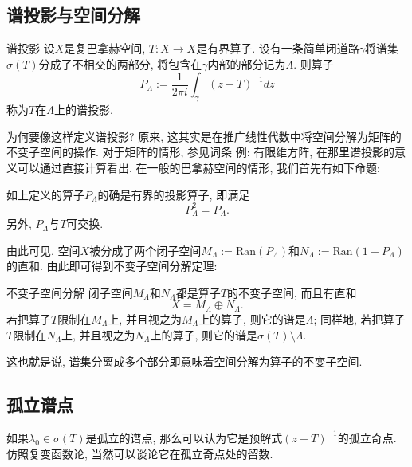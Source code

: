

\subsection{谱投影与空间分解}
\begin{definition}{谱投影}
设$X$是复巴拿赫空间, $T:X\to X$是有界算子. 设有一条简单闭道路$\gamma$将谱集$\sigma(T)$分成了不相交的两部分, 将包含在$\gamma$内部的部分记为$\Lambda$. 则算子
$$
P_\Lambda:=\frac{1}{2\pi i}\int_\gamma(z-T)^{-1}dz
$$
称为$T$在$\Lambda$上的谱投影.
\end{definition}

为何要像这样定义谱投影? 原来, 这其实是在推广线性代数中将空间分解为矩阵的不变子空间的操作. 对于矩阵的情形, 参见词条 例: 有限维方阵, 在那里谱投影的意义可以通过直接计算看出. 在一般的巴拿赫空间的情形, 我们首先有如下命题:

\begin{lemma}{}
如上定义的算子$P_\Lambda$的确是有界的投影算子, 即满足
$$
P_\Lambda^2=P_\Lambda.
$$
另外, $P_\Lambda$与$T$可交换.
\end{lemma}

由此可见, 空间$X$被分成了两个闭子空间$M_\Lambda:=\text{Ran}(P_\Lambda)$和$N_\Lambda:=\text{Ran}(1-P_\Lambda)$的直和. 由此即可得到不变子空间分解定理:

\begin{theorem}{不变子空间分解}
闭子空间$M_\Lambda$和$N_\Lambda$都是算子$T$的不变子空间, 而且有直和
$$
X=M_\Lambda\oplus N_\Lambda.
$$
若把算子$T$限制在$M_\Lambda$上, 并且视之为$M_\Lambda$上的算子, 则它的谱是$\Lambda$; 同样地, 若把算子$T$限制在$N_\Lambda$上, 并且视之为$N_\Lambda$上的算子, 则它的谱是$\sigma(T)\setminus\Lambda$.
\end{theorem}

这也就是说, 谱集分离成多个部分即意味着空间分解为算子的不变子空间.

\subsection{孤立谱点}
如果$\lambda_0\in\sigma(T)$是孤立的谱点, 那么可以认为它是预解式$(z-T)^{-1}$的孤立奇点. 仿照复变函数论, 当然可以谈论它在孤立奇点处的留数.